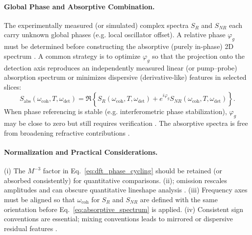 \paragraph{Global Phase and Absorptive Combination.}
\noindent The experimentally measured (or simulated) complex spectra $S_{R}$ and $S_{NR}$ each carry unknown global phases (e.g. local oscillator offset). A relative phase $\varphi_g$ must be determined before constructing the absorptive (purely in-phase) 2D spectrum \cite{mukamel1995principlesnonlinearoptical, jonas2003twodimensionalfemtosecondspectroscopy, greenetal2024vibrationalcoherenceshalfbroadband}. A common strategy is to optimize $\varphi_g$ so that the projection onto the detection axis reproduces an independently measured linear (or pump--probe) absorption spectrum or minimizes dispersive (derivative-like) features in selected slices:
\begin{equation}
	S_{\text{abs}}(\omega_{\text{coh}}, T, \omega_{\text{det}})
	=
	\Re \left\{
	S_{R}(\omega_{\text{coh}}, T, \omega_{\text{det}}) + e^{i \varphi_g} S_{NR}(\omega_{\text{coh}}, T, \omega_{\text{det}})
	\right\}.
	\label{eq:absorptive_spectrum}
\end{equation}
When phase referencing is stable (e.g. interferometric phase stabilization), $\varphi_g$ may be close to zero but still requires verification \cite{brixneretal2004phasestabilizedtwodimensionalelectronic, greenetal2024vibrationalcoherenceshalfbroadband}.
The absorptive spectra is free from broadening refractive contributions \cite{fullerogilvie2015experimentalimplementationstwodimensional}.


\paragraph{Normalization and Practical Considerations.}
\noindent (i) The $M^{-3}$ factor in Eq.~\eqref{eq:dft_phase_cycling} should be retained (or absorbed consistently) for quantitative comparisons. (ii); omission rescales amplitudes and can obscure quantitative lineshape analysis \cite{cho2009twodimensionalopticalspectroscopy, greenetal2024vibrationalcoherenceshalfbroadband}. (iii) Frequency axes must be aligned so that $\omega_{\text{coh}}$ for $S_{R}$ and $S_{NR}$ are defined with the same orientation before Eq.~\eqref{eq:absorptive_spectrum} is applied. (iv) Consistent sign conventions are essential; mixing conventions leads to mirrored or dispersive residual features \cite{mukamel1995principlesnonlinearoptical, cho2009twodimensionalopticalspectroscopy, greenetal2024vibrationalcoherenceshalfbroadband}.

